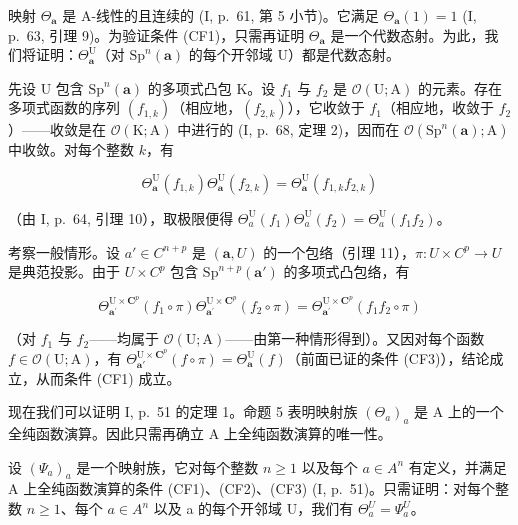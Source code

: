 映射 \(\Theta_{\pmb{a}}\) 是 A-线性的且连续的 (I, p.~61, 第 5 小节)。它满足 \(\Theta_{\pmb{a}}(1) = 1\) (I, p.~63, 引理 9)。为验证条件 (CF1)，只需再证明 \(\Theta_{\pmb{a}}\) 是一个代数态射。为此，我们将证明：\(\Theta_{\pmb{a}}^{\mathrm{U}}\)（对 \(\mathrm{Sp}^{n}(\pmb{a})\) 的每个开邻域 U）都是代数态射。

先设 U 包含 \(\mathrm{Sp}^{n}(\boldsymbol{a})\) 的多项式凸包 K。设 \(f_{1}\) 与 \(f_{2}\) 是 \(\mathcal{O}(\mathrm{U};\mathrm{A})\) 的元素。存在多项式函数的序列 \((f_{1,k})\)（相应地，\((f_{2,k})\)），它收敛于 \(f_{1}\)（相应地，收敛于 \(f_{2}\)）——收敛是在 \(\mathcal{O}(\mathrm{K};\mathrm{A})\) 中进行的 (I, p.~68, 定理 2)，因而在 \(\mathcal{O}(\mathrm{Sp}^{n}(\boldsymbol{a});\mathrm{A})\) 中收敛。对每个整数 \(k\)，有

\[
\Theta_ {\boldsymbol {a}} ^ {\mathrm{U}} (f _ {1, k}) \Theta_ {\boldsymbol {a}} ^ {\mathrm{U}} (f _ {2, k}) = \Theta_ {\boldsymbol {a}} ^ {\mathrm{U}} (f _ {1, k} f _ {2, k})
\]

（由 I, p.~64, 引理 10），取极限便得 \(\Theta_{a}^{\mathrm{U}}(f_{1})\Theta_{a}^{\mathrm{U}}(f_{2}) = \Theta_{a}^{\mathrm{U}}(f_{1}f_{2})\)。

考察一般情形。设 \(a' \in C^{n+p}\) 是 \((\boldsymbol{a}, U)\) 的一个包络（引理 11），\(\pi: U \times C^{p} \to U\) 是典范投影。由于 \(U \times C^{p}\) 包含 \(\mathrm{Sp}^{n+p}(\boldsymbol{a}')\) 的多项式凸包络，有

\[
\Theta_ {\boldsymbol {a} ^ {\prime}} ^ {\mathrm{U} \times \mathbf {C} ^ {p}} (f _ {1} \circ \pi) \Theta_ {\boldsymbol {a} ^ {\prime}} ^ {\mathrm{U} \times \mathbf {C} ^ {p}} (f _ {2} \circ \pi) = \Theta_ {\boldsymbol {a} ^ {\prime}} ^ {\mathrm{U} \times \mathbf {C} ^ {p}} (f _ {1} f _ {2} \circ \pi)
\]

（对 \(f_1\) 与 \(f_2\)——均属于 \(\mathcal{O}(\mathrm{U};\mathrm{A})\)——由第一种情形得到）。又因对每个函数 \(f \in \mathcal{O}(\mathrm{U};\mathrm{A})\)，有 \(\Theta_{\boldsymbol{a}'}^{\mathrm{U}\times \mathbf{C}^p}(f\circ \pi) = \Theta_{\boldsymbol{a}}^{\mathrm{U}}(f)\)（前面已证的条件 (CF3)），结论成立，从而条件 (CF1) 成立。

现在我们可以证明 I, p.~51 的定理 1。命题 5 表明映射族 \((\Theta_{a})_{a}\) 是 A 上的一个全纯函数演算。因此只需再确立 A 上全纯函数演算的唯一性。

设 \((\Psi_{a})_{a}\) 是一个映射族，它对每个整数 \(n \geqslant 1\) 以及每个 \(a \in A^{n}\) 有定义，并满足 A 上全纯函数演算的条件 (CF1)、(CF2)、(CF3) (I, p.~51)。只需证明：对每个整数 \(n \geqslant 1\)、每个 \(a \in A^{n}\) 以及 a 的每个开邻域 U，我们有 \(\Theta_{a}^{U} = \Psi_{a}^{U}\)。

